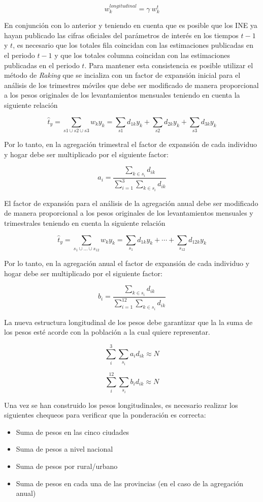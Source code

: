 \[w_k^{longitudinal} = \gamma \  w_k^{t}\]

En conjunción con lo anterior y teniendo en cuenta que es posible que los INE ya hayan publicado las cifras oficiales del parámetros de interés en los tiempos \(t-1\) y \(t\), es necesario que los totales fila coincidan con las estimaciones publicadas en el periodo \(t-1\) y que los totales columna coincidan con las estimaciones publicadas en el periodo \(t\). Para mantener esta consistencia es posible utilizar el método de \emph{Raking} que se incializa con un factor de expansión inicial para el análisis de los trimestres móviles que debe ser modificado de manera proporcional a los pesos originales de los levantamientos mensuales teniendo en cuenta la siguiente relación

\[
\hat{t}_y = \sum_{s1 \cup s2 \cup s3} w_k y_k
= \sum_{s1} d_{1k} y_k + \sum_{s2} d_{2k} y_k + \sum_{s3} d_{3k} y_k
\]

Por lo tanto, en la agregación trimestral el factor de expansión de cada individuo y hogar debe ser multiplicado por el siguiente factor:

\[
a_i = \frac{\sum_{k\in s_i}d_{ik}}{\sum_{i=1}^{3}\sum_{k\in s_i}d_{ik}}
\]

El factor de expansión para el análisis de la agregación anual debe ser modificado de manera proporcional a los pesos originales de los levantamientos mensuales y trimestrales teniendo en cuenta la siguiente relación

\[
\hat{t}_y = \sum_{s_1 \cup ... \cup s_{12}} w_k y_k
= \sum_{s_1} d_{1k} y_k + \cdots + \sum_{s_{12}} d_{12k} y_k
\]

Por lo tanto, en la agregación anual el factor de expansión de cada individuo y hogar debe ser multiplicado por el siguiente factor:

\[
b_i = \frac{\sum_{k\in s_i}d_{ik}}{\sum_{i=1}^{12}\sum_{k\in s_i}d_{ik}}
\]

La nueva estructura longitudinal de los pesos debe garantizar que la la suma de los pesos esté acorde con la población a la cual quiere representar.

\[
\sum_{i}^{3}\sum_{s_i} a_i d_{ik} \approx N
\]

\[
\sum_{i}^{12}\sum_{s_i} b_i d_{ik} \approx N
\]

Una vez se han construido los pesos longitudinales, es necesario realizar los siguientes chequeos para verificar que la ponderación es correcta:

\begin{itemize}
\tightlist
\item
  Suma de pesos en las cinco ciudades
\item
  Suma de pesos a nivel nacional
\item
  Suma de pesos por rural/urbano
\item
  Suma de pesos en cada una de las provincias (en el caso de la agregación anual)
\end{itemize}

